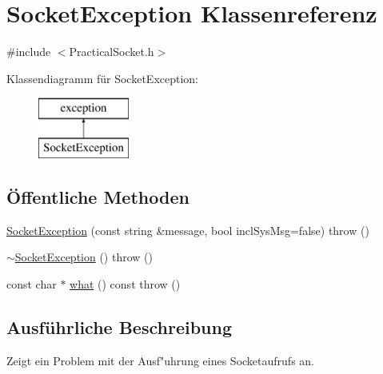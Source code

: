 \hypertarget{classSocketException}{\section{Socket\-Exception Klassenreferenz}
\label{classSocketException}
}


{\ttfamily \#include $<$Practical\-Socket.\-h$>$}

Klassendiagramm für Socket\-Exception\-:\begin{figure}[H]
\begin{center}
\leavevmode
\includegraphics[height=2.000000cm]{classSocketException}
\end{center}
\end{figure}
\subsection*{Öffentliche Methoden}
\begin{DoxyCompactItemize}
\item 
\hyperlink{classSocketException_abb5bcecd9d9e20868c237ec5a82cf5c3}{Socket\-Exception} (const string \&message, bool incl\-Sys\-Msg=false)  throw ()
\item 
\hyperlink{classSocketException_a659557c899329aea01977c980c4db9b9}{$\sim$\-Socket\-Exception} ()  throw ()
\item 
const char $\ast$ \hyperlink{classSocketException_a06b7b3f186976bb5ec7e7bf007c4f0ac}{what} () const   throw ()
\end{DoxyCompactItemize}


\subsection{Ausführliche Beschreibung}
Zeigt ein Problem mit der Ausf"uhrung eines Socketaufrufs an. 

